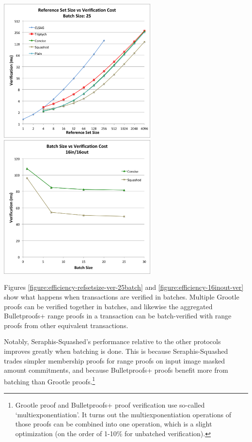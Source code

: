 \begin{center}
    \includegraphics[width=8cm]{figures/refset_25batch_ver.png}
    \includegraphics[width=8cm]{figures/16inout_ver.png}
    \label{figure:efficiency-refsetsize-ver-25batch}
    \label{figure:efficiency-16inout-ver}
\end{center}

Figures \ref{figure:efficiency-refsetsize-ver-25batch} and \ref{figure:efficiency-16inout-ver} show what happens when transactions are verified in batches. Multiple Grootle proofs can be verified together in batches, and likewise the aggregated Bulletproofs+ range proofs in a transaction can be batch-verified with range proofs from other equivalent transactions.

Notably, Seraphis-Squashed's performance relative to the other protocols improves greatly when batching is done. This is because Seraphis-Squashed trades simpler membership proofs for range proofs on input image masked amount commitments, and because Bulletproofs+ proofs benefit more from batching than Grootle proofs.\footnote{Grootle proof and Bulletproofs+ proof verification use so-called `multiexponentiation'. It turns out the multiexponentiation operations of those proofs can be combined into one operation, which is a slight optimization (on the order of 1-10\% for unbatched verification).}

